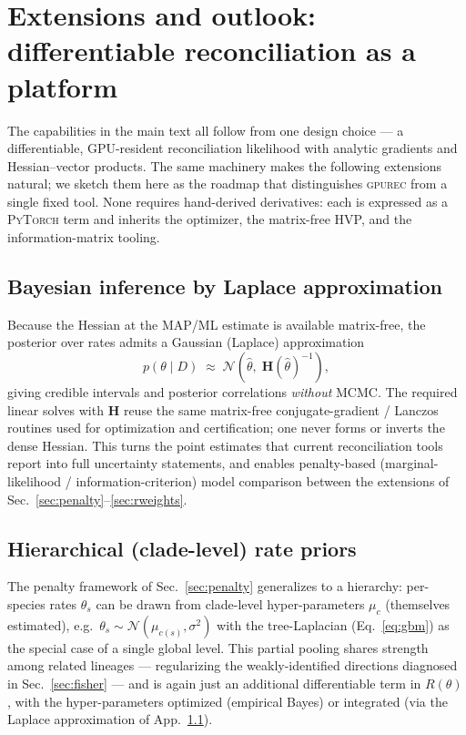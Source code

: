\documentclass[11pt]{article}
\newcommand{\toolname}{\textsc{gpurec}\xspace}
\newcommand{\Hess}{\mathbf{H}}
\begin{document}
\appendix
\section{Extensions and outlook: differentiable reconciliation as a platform}
\label{app:outlook}
The capabilities in the main text all follow from one design choice --- a
differentiable, GPU-resident reconciliation likelihood with analytic gradients and
Hessian--vector products. The same machinery makes the following extensions
natural; we sketch them here as the roadmap that distinguishes \toolname from a
single fixed tool. None requires hand-derived derivatives: each is expressed as
a \textsc{PyTorch} term and inherits the optimizer, the matrix-free HVP, and the
information-matrix tooling.

\subsection{Bayesian inference by Laplace approximation}
\label{app:laplace}
Because the Hessian at the MAP/ML estimate is available matrix-free, the
posterior over rates admits a Gaussian (Laplace) approximation
\begin{equation}
  p(\theta \mid D) \;\approx\; \mathcal{N}\!\left(\hat\theta,\; \Hess(\hat\theta)^{-1}\right),
  \label{eq:laplace}
\end{equation}
giving credible intervals and posterior correlations \emph{without} MCMC. The
required linear solves with $\Hess$ reuse the same matrix-free conjugate-gradient
/ Lanczos routines used for optimization and certification; one never forms or
inverts the dense Hessian. This turns the point estimates that current
reconciliation tools report into full uncertainty statements, and enables
penalty-based (marginal-likelihood / information-criterion) model comparison
between the extensions of Sec.~\ref{sec:penalty}--\ref{sec:rweights}.

\subsection{Hierarchical (clade-level) rate priors}
\label{app:hier}
The penalty framework of Sec.~\ref{sec:penalty} generalizes to a hierarchy:
per-species rates $\theta_s$ can be drawn from clade-level hyper-parameters
$\mu_c$ (themselves estimated), e.g.\ $\theta_s \sim \mathcal{N}(\mu_{c(s)},
\sigma^2)$ with the tree-Laplacian (Eq.~\eqref{eq:gbm}) as the special case of a
single global level. This partial pooling shares strength among related lineages
--- regularizing the weakly-identified directions diagnosed in
Sec.~\ref{sec:fisher} --- and is again just an additional differentiable term in
$R(\theta)$, with the hyper-parameters optimized (empirical Bayes) or integrated
(via the Laplace approximation of App.~\ref{app:laplace}).
\end{document}
